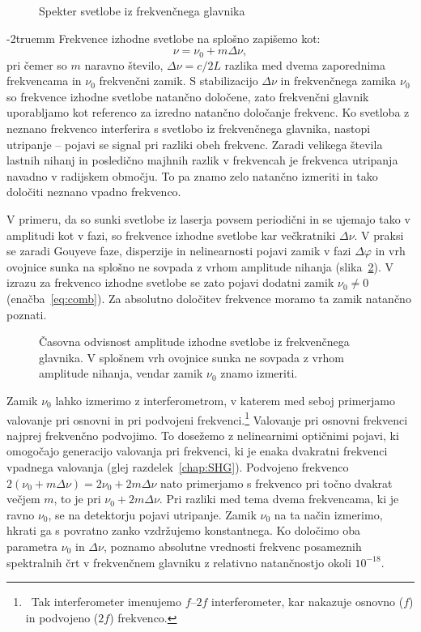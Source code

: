 \begin{figure}[ht]
\centering
\def\svgwidth{100truemm} 

\caption{Spekter svetlobe iz frekvenčnega glavnika}
\label{fig:comb}
\end{figure}
\vglue-2truemm
Frekvence izhodne svetlobe na splošno zapišemo kot:
\begin{equation}
\nu = \nu_0 + m\Delta \nu,
\label{eq:comb}
\end{equation}
pri čemer so $m$ naravno število, $\Delta \nu = c/2L$ razlika med dvema zaporednima 
frekvencama in $\nu_0$ frekvenčni zamik. S stabilizacijo $\Delta \nu$ in 
frekvenčnega zamika $\nu_0$ so frekvence izhodne svetlobe  
natančno določene, zato frekvenčni glavnik uporabljamo kot referenco 
za izredno natančno določanje frekvenc. Ko svetloba z neznano frekvenco
interferira s svetlobo iz frekvenčnega glavnika, nastopi utripanje -- pojavi
se signal pri razliki obeh frekvenc. Zaradi velikega števila lastnih nihanj 
in posledično majhnih razlik v frekvencah je frekvenca utripanja navadno v 
radijskem območju. To pa znamo zelo natančno izmeriti in tako določiti neznano 
vpadno frekvenco.

V primeru, da so sunki svetlobe iz laserja povsem periodični in se ujemajo tako
v amplitudi kot v fazi, so frekvence izhodne svetlobe kar 
večkratniki $\Delta \nu$. V praksi se zaradi Gouyeve faze,
disperzije in nelinearnosti pojavi zamik
v fazi $\Delta \varphi$ in vrh ovojnice sunka na splošno ne sovpada z vrhom amplitude
nihanja (slika~\ref{fig:comb2}). V izrazu za
frekvenco izhodne svetlobe se zato pojavi dodatni zamik $\nu_0 \neq 0$ (enačba~\ref{eq:comb}). 
Za absolutno določitev frekvence moramo ta zamik natančno poznati. 
\begin{figure}[ht]
\centering
\def\svgwidth{110truemm} 

\caption{Časovna odvisnost amplitude izhodne svetlobe iz frekvenčnega glavnika. V splošnem
vrh ovojnice sunka ne sovpada z vrhom amplitude nihanja, vendar zamik $\nu_0$ znamo izmeriti.}
\label{fig:comb2}
\end{figure}

Zamik $\nu_0$ lahko izmerimo
z interferometrom, v katerem med seboj primerjamo valovanje pri 
osnovni in pri podvojeni frekvenci.\footnote{~Tak interferometer imenujemo $f$--$2f$
interferometer, kar nakazuje osnovno ($f$) in podvojeno ($2f$) frekvenco.}
Valovanje pri osnovni frekvenci najprej frekvenčno podvojimo. To dosežemo 
z nelinearnimi optičnimi pojavi, ki omogočajo generacijo valovanja pri frekvenci, 
ki je enaka dvakratni frekvenci vpadnega valovanja 
(glej razdelek~\ref{chap:SHG}). Podvojeno frekvenco $2(\nu_0 + 
m\Delta \nu)= 2\nu_0 + 2m\Delta \nu$ nato primerjamo s frekvenco pri 
točno dvakrat večjem $m$, to je pri $\nu_0 + 2m\Delta \nu$. Pri razliki med tema
dvema frekvencama, ki je ravno $\nu_0$, se na detektorju pojavi utripanje.
Zamik $\nu_0$ na ta način izmerimo, hkrati ga s povratno zanko
vzdržujemo konstantnega. Ko določimo oba parametra $\nu_0$ in $\Delta \nu$, 
poznamo absolutne vrednosti frekvenc posameznih spektralnih črt v frekvenčnem 
glavniku z relativno natančnostjo okoli $10^{-18}$.

